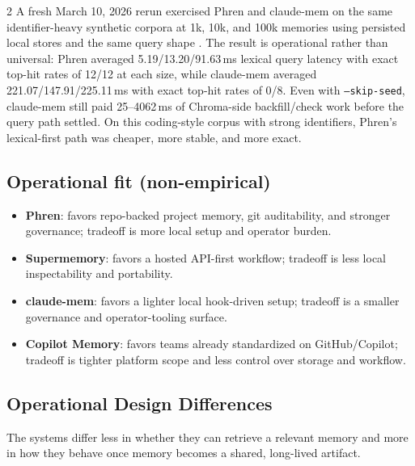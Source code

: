 \documentclass[10pt]{article}
\begin{document}
\begin{multicols}{2}
A fresh March 10, 2026 rerun exercised Phren and claude-mem on the same identifier-heavy synthetic corpora at 1k, 10k, and 100k memories using persisted local stores and the same query shape \cite{phren-bench,phren-bench-claude,phren-bench-compare}. The result is operational rather than universal: Phren averaged 5.19/13.20/91.63\,ms lexical query latency with exact top-hit rates of 12/12 at each size, while claude-mem averaged 221.07/147.91/225.11\,ms with exact top-hit rates of 0/8. Even with \texttt{--skip-seed}, claude-mem still paid 25--4062\,ms of Chroma-side backfill/check work before the query path settled. On this coding-style corpus with strong identifiers, Phren's lexical-first path was cheaper, more stable, and more exact.

\subsection{Operational fit (non-empirical)}

\begin{itemize}
  \item \textbf{Phren}: favors repo-backed project memory, git auditability, and stronger governance; tradeoff is more local setup and operator burden.
  \item \textbf{Supermemory}: favors a hosted API-first workflow; tradeoff is less local inspectability and portability.
  \item \textbf{claude-mem}: favors a lighter local hook-driven setup; tradeoff is a smaller governance and operator-tooling surface.
  \item \textbf{Copilot Memory}: favors teams already standardized on GitHub/Copilot; tradeoff is tighter platform scope and less control over storage and workflow.
\end{itemize}

\subsection{Operational Design Differences}

The systems differ less in whether they can retrieve a relevant memory and more in how they behave once memory becomes a shared, long-lived artifact.


\end{multicols}
\end{document}
